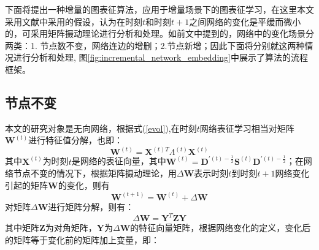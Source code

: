 下面将提出一种增量的图表征算法，应用于增量场景下的图表征学习，在这里本文采用文献\cite{chi2007evolutionary}中采用的假设，认为在时刻$t$和时刻$t+1$之间网络的变化是平缓而微小的，可采用矩阵摄动理论\cite{stewart1990matrix, asucheetah}进行分析和处理。如前文中提到的，网络中的变化场景分两类：1. 节点数不变，网络连边的增删；2.节点新增；因此下面将分别就这两种情况进行分析和处理,
图\ref{fig:incremental_network_embedding}中展示了算法的流程框架。

\subsection{节点不变}
本文的研究对象是无向网络，根据式(\ref{evol}),在时刻$t$网络表征学习相当对矩阵$\textbf{W}^{(t)}$进行特征值分解，也即：
\begin{equation}
	\textbf{W}^{(t)} = \textbf{X}^{(t)T} \Lambda^{(t)} \textbf{X} ^{(t)}
\end{equation}
其中$\textbf{X} ^{(t)}$为时刻$t$是网络的表征向量，其中$\textbf{W}^{(t)} = \textbf{D}^{\prime(t)-\frac{1}{2}}\textbf{S}^{(t)}\textbf{D}^{\prime(t)-\frac{1}{2}}$；在网络节点不变的情况下，根据矩阵摄动理论\cite{stewart1990matrix}，用$\Delta\textbf{W}$表示时刻$t$到时刻$t+1$网络变化引起的矩阵$\textbf{W}$的变化，则有
\begin{equation}
	\textbf{W}^{(t+1)} = \textbf{W}^{(t)} + \Delta\textbf{W}
\end{equation}
对矩阵$\Delta\textbf{W}$进行矩阵分解，则有：
\begin{equation}
	\Delta\textbf{W} =  \textbf{Y}^{T} \textbf{Z}  \textbf{Y}
\end{equation}
其中矩阵$\textbf{Z}$为对角矩阵，$\textbf{Y}$为$\Delta\textbf{W}$的特征向量矩阵，根据网络变化的定义，变化后的矩阵等于变化前的矩阵加上变量，即：
